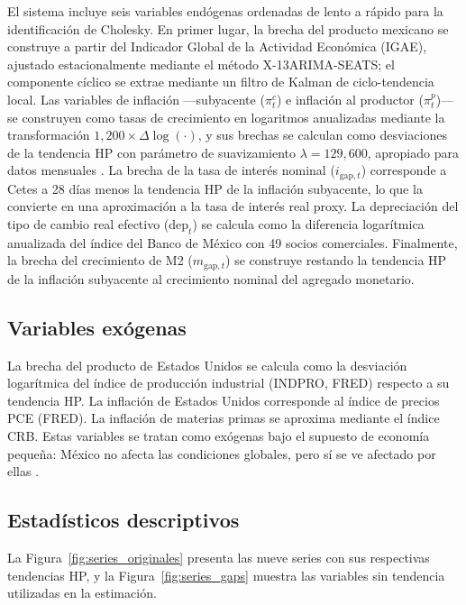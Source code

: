 \documentclass[12pt,a4paper]{article}
\begin{document}
El sistema incluye seis variables endógenas ordenadas de lento a rápido para la
identificación de Cholesky.
En primer lugar, la brecha del producto mexicano se construye a partir del Indicador
Global de la Actividad Económica (IGAE), ajustado estacionalmente mediante el método
X-13ARIMA-SEATS; el componente cíclico se extrae mediante un filtro de Kalman de
ciclo-tendencia local.
Las variables de inflación —subyacente ($\pi_t^c$) e inflación al productor
($\pi_t^p$)— se construyen como tasas de crecimiento en logaritmos anualizadas
mediante la transformación $1{,}200 \times \Delta\log(\cdot)$, y sus brechas se calculan
como desviaciones de la tendencia HP con parámetro de suavizamiento $\lambda = 129{,}600$,
apropiado para datos mensuales \citep{carrilloelizondo2018}.
La brecha de la tasa de interés nominal ($i_{\text{gap},t}$) corresponde a Cetes a 28
días menos la tendencia HP de la inflación subyacente, lo que la convierte en una
aproximación a la tasa de interés real proxy.
La depreciación del tipo de cambio real efectivo ($\text{dep}_t$) se calcula como la
diferencia logarítmica anualizada del índice del Banco de México con 49
socios comerciales.
Finalmente, la brecha del crecimiento de M2 ($m_{\text{gap},t}$) se construye restando
la tendencia HP de la inflación subyacente al crecimiento nominal del agregado monetario.

\subsection{Variables exógenas}

La brecha del producto de Estados Unidos se calcula como la desviación logarítmica del
índice de producción industrial (INDPRO, FRED) respecto a su tendencia HP.
La inflación de Estados Unidos corresponde al índice de precios PCE (FRED).
La inflación de materias primas se aproxima mediante el índice CRB.
Estas variables se tratan como exógenas bajo el supuesto de economía pequeña:
México no afecta las condiciones globales, pero sí se ve afectado por ellas
\citep{cushmanZha1997}.




\subsection{Estadísticos descriptivos}

La Figura~\ref{fig:series_originales} presenta las nueve series con sus respectivas
tendencias HP, y la Figura~\ref{fig:series_gaps} muestra las variables sin tendencia
utilizadas en la estimación.
\end{document}
